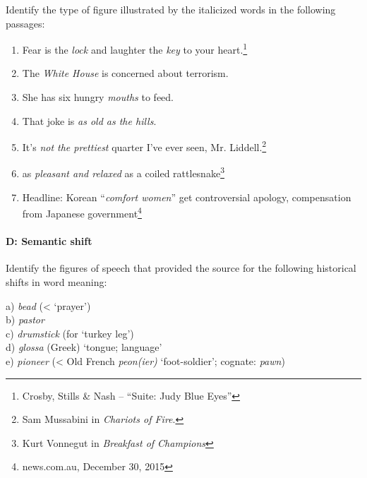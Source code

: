 {Identify the type of figure illustrated by the italicized words in the following passages:

\begin{enumerate}
\item Fear is the \textit{lock} and laughter the \textit{key} to your heart.\footnote{Crosby, Stills \& Nash – “Suite: Judy Blue Eyes”}
\item The \textit{White House} is concerned about terrorism.
\item She has six hungry \textit{mouths} to feed.
\item That joke is \textit{as old as the hills}.
\item It’s \textit{not the prettiest} quarter I’ve ever seen, Mr. Liddell.\footnote{Sam Mussabini in \textit{Chariots of Fire}.}
\item as \textit{pleasant and relaxed} as a coiled rattlesnake\footnote{Kurt Vonnegut in \textit{Breakfast of Champions}}
\item Headline: Korean “\textit{comfort women}” get controversial apology, compensation from Japanese government\footnote{news.com.au, December 30, 2015}
\end{enumerate}
\paragraph*{D: Semantic shift}

Identify the figures of speech that provided the source for the following historical shifts in word meaning:

\begin{stylepoints}
a) \textit{bead} (< ‘prayer’)\\
b) \textit{pastor}\\
c) \textit{drumstick} (for ‘turkey leg’)\\
d) \textit{glossa} (Greek) ‘tongue; language’\\
e) \textit{pioneer} (< Old French \textit{peon(ier)} ‘foot-soldier’; cognate: \textit{pawn})
\end{stylepoints}
}


